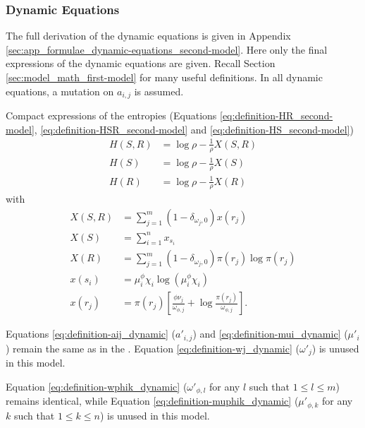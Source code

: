 \subsubsection{Dynamic Equations}

The full derivation of the dynamic equations is given in Appendix \ref{sec:app_formulae_dynamic-equations_second-model}.
Here only the final expressions of the dynamic equations are given. Recall Section \ref{sec:model_math_first-model} for many useful definitions. In all dynamic equations, a mutation on $a_{i,j}$ is assumed.

Compact expressions of the entropies (Equations \eqref{eq:definition-HR_second-model}, \eqref{eq:definition-HSR_second-model} and \eqref{eq:definition-HS_second-model})
\begin{align}
  \label{eq:definition-HSR_second-model_compact}
  H(S,R) &= \log \rho - \frac{1}{\rho} X(S,R) \\
  \label{eq:definition-HS_second-model_compact}
  H(S) &= \log \rho - \frac{1}{\rho} X(S) \\
  \label{eq:definition-HR_second-model_compact}
  H(R) &= \log \rho - \frac{1}{\rho} X(R)
\end{align}
with
\begin{align}
  \label{eq:definition-XSR_second-model}
  X(S,R) &= \sum_{j=1}^m (1 - \delta_{\omega_j,0}) x(r_j) \\
  \label{eq:definition-XS_second-model}
  X(S) &= \sum_{i=1}^n x_{s_i} \\
  \label{eq:definition-XR_second-model}
  X(R) &= \sum_{j=1}^m (1-\delta_{\omega_j,0}) \pi(r_j) \log \pi(r_j) \\
  \label{eq:definition-xsi_second-model}
  x(s_i) &= \mu_i^\phi \chi_i \log \left( \mu_i^\phi \chi_i \right) \\
  \label{eq:definition-xrj_second-model}
  x(r_j) &= \pi(r_j) \left[ \frac{\phi \nu_j}{\omega_{\phi,j}} + \log \frac{\pi(r_j)}{\omega_{\phi,j}} \right].
\end{align}

Equations \eqref{eq:definition-aij_dynamic} ($a'_{i,j}$) and \eqref{eq:definition-mui_dynamic} ($\mu'_i$) remain the same as in the \firstmodel{}.
Equation \eqref{eq:definition-wj_dynamic} ($\omega'_j$) is unused in this model.

Equation \eqref{eq:definition-wphik_dynamic} ($\omega'_{\phi,l}$ for any $l$ such that $1 \leq l \leq m$) remains identical, while Equation \eqref{eq:definition-muphik_dynamic} ($\mu'_{\phi,k}$ for any $k$ such that $1 \leq k \leq n$) is unused in this model.

